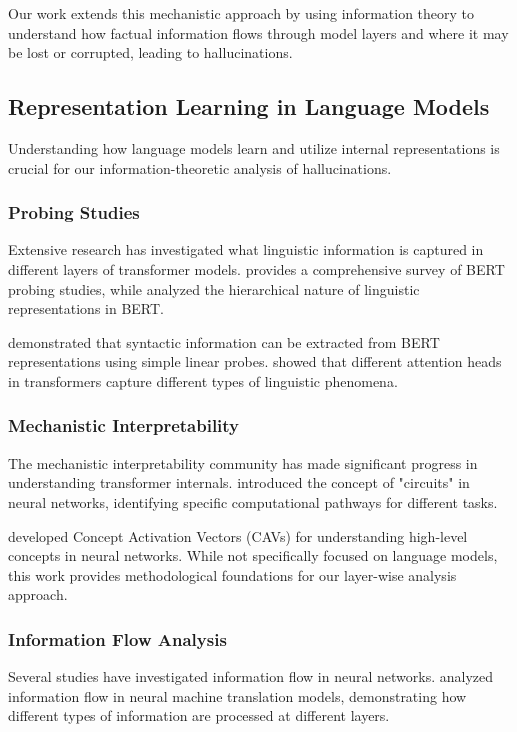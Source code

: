 Our work extends this mechanistic approach by using information theory to understand how factual information flows through model layers and where it may be lost or corrupted, leading to hallucinations.

\subsection{Representation Learning in Language Models}
\label{subsec:repr_learning_lm}

Understanding how language models learn and utilize internal representations is crucial for our information-theoretic analysis of hallucinations.

\subsubsection{Probing Studies}
Extensive research has investigated what linguistic information is captured in different layers of transformer models. \citet{rogers2020primer} provides a comprehensive survey of BERT probing studies, while \citet{tenney2019bert} analyzed the hierarchical nature of linguistic representations in BERT.

\citet{hewitt2019structural} demonstrated that syntactic information can be extracted from BERT representations using simple linear probes. \citet{voita2019analyzing} showed that different attention heads in transformers capture different types of linguistic phenomena.

\subsubsection{Mechanistic Interpretability}
The mechanistic interpretability community has made significant progress in understanding transformer internals. \citet{olah2020zoom} introduced the concept of "circuits" in neural networks, identifying specific computational pathways for different tasks.

\citet{kim2018interpretability} developed Concept Activation Vectors (CAVs) for understanding high-level concepts in neural networks. While not specifically focused on language models, this work provides methodological foundations for our layer-wise analysis approach.

\subsubsection{Information Flow Analysis}
Several studies have investigated information flow in neural networks. \citet{voita2019information} analyzed information flow in neural machine translation models, demonstrating how different types of information are processed at different layers.

